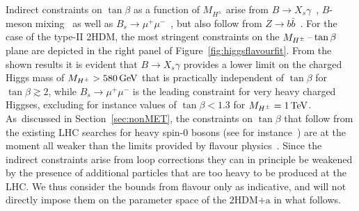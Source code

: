 \documentclass[a4paper, 11pt,notoc]{article}
\newcommand{\hdma}{\ensuremath{\textrm{2HDM+a}}\xspace}
\begin{document}
Indirect constraints on $\tan \beta$ as a function of $M_{H^\pm}$ arise from $B \to X_s \gamma$~\cite{Hermann:2012fc,Misiak:2015xwa,Misiak:2017bgg}, $B$-meson mixing~\cite{Abbott:1979dt,Geng:1988bq,Buras:1989ui,Kirk:2017juj} as well as  $B_s \to \mu^+ \mu^-$~\cite{Skiba:1992mg,Logan:2000iv,Chankowski:2000ng,Bobeth:2001sq,Bobeth:2013uxa,CMS:2014xfa,Aaij:2017vad}, but also follow from $Z \to b \bar b$~\cite{Denner:1991ie,Haisch:2007ia,Freitas:2012sy}. For the case of the type-II 2HDM, the most stringent constraints on the $M_{H^{\pm}}\hspace{0.5mm}$--$\hspace{0.5mm}\tan \beta$ plane are depicted in the right panel of Figure~\ref{fig:higgsflavourfit}. From the shown results it is evident that $B \to X_s \gamma$ provides a lower limit on the charged Higgs mass of $M_{H^\pm} > 580 \, {\rm GeV}$ that is practically independent of $\tan \beta$ for $\tan \beta \gtrsim 2$, while $B_s \to \mu^+ \mu^-$ is the leading constraint for very heavy charged Higgses, excluding for instance values of $\tan \beta < 1.3$ for $M_{H^\pm} = 1 \, {\rm TeV}$. As~discussed in Section~\ref{sec:nonMET}, the constraints on $\tan \beta$ that follow from the existing LHC searches for heavy {\color{red} spin-0 bosons} (see for instance~\cite{Aaboud:2017sjh,Sirunyan:2018zut,Aaboud:2017hnm,ATLAS-CONF-2016-104,Sirunyan:2017roi,Aaboud:2018xuw})  are at the moment all weaker than the limits provided by flavour physics~\cite{Bauer:2017ota}. Since the  indirect constraints   arise from loop corrections they can in principle be weakened by the presence of additional particles that are too heavy to be produced at the LHC. We thus consider the bounds from flavour only as indicative, and will not directly impose them on the parameter space of the \hdma in what follows. 
\end{document}
